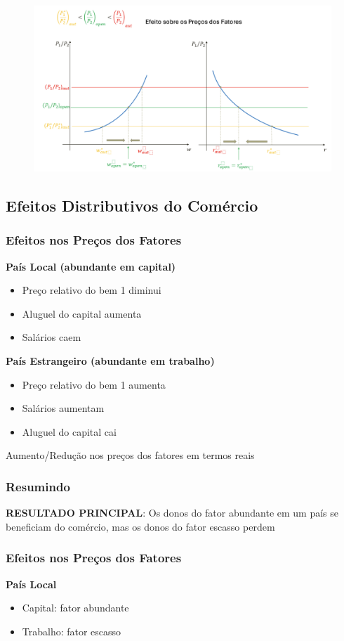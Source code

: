 \documentclass[a4paper,12pt]{article}[abntex2]
\begin{document}
\begin{figure}[H]
    \centering
    \includegraphics[width=0.7\linewidth]{Imagens/a12i13.png}
\end{figure}

\subsection{\textbf{Efeitos Distributivos do Comércio}}
\subsubsection{\textbf{Efeitos nos Preços dos Fatores}}

\textbf{País Local (abundante em capital)}
\begin{itemize}
    \item Preço relativo do bem 1 diminui
    \item Aluguel do capital aumenta
    \item Salários caem
\end{itemize}

\textbf{País Estrangeiro (abundante em trabalho)}
\begin{itemize}
    \item Preço relativo do bem 1 aumenta
    \item Salários aumentam
    \item Aluguel do capital cai
\end{itemize}

Aumento/Redução nos preços dos fatores em termos reais

\subsubsection{\textbf{Resumindo}}
\textbf{RESULTADO PRINCIPAL}: Os donos do fator abundante em um país se beneficiam do comércio, mas os donos do fator escasso perdem

\subsubsection{\textbf{Efeitos nos Preços dos Fatores}}
\textbf{País Local}
\begin{itemize}
    \item Capital: fator abundante
    \item Trabalho: fator escasso
\end{itemize}
\end{document}

